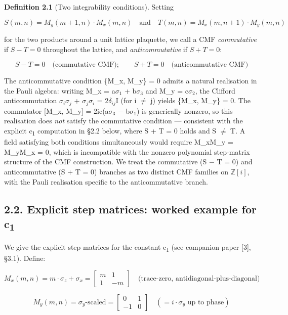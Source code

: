 \documentclass[11pt]{article}
\begin{document}
\textbf{Definition 2.1} (Two integrability conditions). Setting

\[S(m,n) = M_y(m+1,n)\cdot M_x(m,n) \quad \text{and} \quad T(m,n) = M_x(m,n+1)\cdot M_y(m,n)\]

for the two products around a unit lattice plaquette, we call a CMF
\emph{commutative} if \(S - T = 0\) throughout the lattice, and
\emph{anticommutative} if \(S + T = 0\):

\[S - T = 0 \quad \text{(commutative CMF)}; \qquad S + T = 0 \quad \text{(anticommutative CMF)}\]

The anticommutative condition \{M\_x, M\_y\} = 0 admits a natural
realisation in the Pauli algebra: writing M\_x = a\(\sigma_{1}\) +
b\(\sigma_{3}\) and M\_y = c\(\sigma_{2}\), the Clifford anticommutation
\(\sigma _{i}\sigma _{j}\) + \(\sigma _{j}\sigma _{i}\) =
2\(\delta _{ij}\)I (for i \(\neq\) j) yields \{M\_x, M\_y\} = 0. The
commutator {[}M\_x, M\_y{]} = 2ic(a\(\sigma_{3}\) − b\(\sigma_{1}\)) is
generically nonzero, so this realisation does \emph{not} satisfy the
commutative condition --- consistent with the explicit
c\textsubscript{1} computation in §2.2 below, where S + T = 0 holds and
S \(\neq\) T. A field satisfying both conditions simultaneously would
require M\_xM\_y = M\_yM\_x = 0, which is incompatible with the nonzero
polynomial step-matrix structure of the CMF construction. We treat the
commutative (S − T = 0) and anticommutative (S + T = 0) branches as two
distinct CMF families on \(\mathbb{Z}\)\([i]\), with the Pauli
realisation specific to the anticommutative branch.

\hypertarget{explicit-step-matrices-worked-example-for-c}{%
\subsection{\texorpdfstring{2.2. Explicit step matrices: worked example
for
c\textsubscript{1}}{2.2. Explicit step matrices: worked example for c}}\label{explicit-step-matrices-worked-example-for-c}}

We give the explicit step matrices for the constant c\textsubscript{1}
(see companion paper {[}3{]}, §3.1). Define:

\[M_x(m,n) = m\cdot\sigma_z + \sigma_x = \begin{bmatrix} m & 1 \\ 1 & -m \end{bmatrix} \quad \text{(trace-zero, antidiagonal-plus-diagonal)}\]

\[M_y(m,n) = \sigma_y\text{-scaled} = \begin{bmatrix} 0 & 1 \\ -1 & 0 \end{bmatrix} \quad (= i\cdot\sigma_y \text{ up to phase})\]
\end{document}
